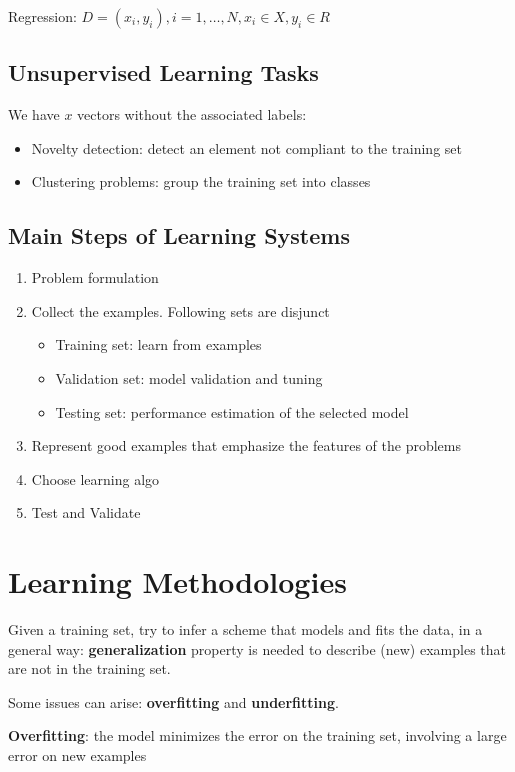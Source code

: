 Regression: $D = {(x_i, y_i), i=1,\dots,N, x_i \in X, y_i \in R}$

\subsection{Unsupervised Learning Tasks}
We have $x$ vectors without the associated labels:
\begin{itemize}
  \item Novelty detection: detect an element not compliant to the training set
  \item Clustering problems: group the training set into classes
\end{itemize}

\subsection{Main Steps of Learning Systems}
\begin{enumerate}
  \item Problem formulation
  \item Collect the examples. Following sets are disjunct
    \begin{itemize}
      \item Training set: learn from examples
      \item Validation set: model validation and tuning
      \item Testing set: performance estimation of the selected model
    \end{itemize}
  \item Represent good examples that emphasize the features of the problems
  \item Choose learning algo
  \item Test and Validate
\end{enumerate}

\section{Learning Methodologies}
Given a training set, try to infer a scheme that models and fits the data, in a general way: \textbf{generalization} property is needed to describe (new) examples that are not in the training set.

Some issues can arise: \textbf{overfitting} and \textbf{underfitting}.

\textbf{Overfitting}: the model minimizes the error on the training set, involving a large error on new examples

